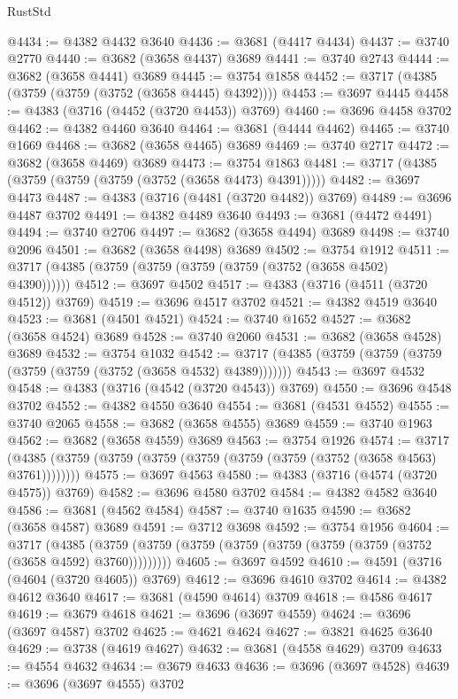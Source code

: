 \begin{lexlean}{RustStd}
\begin{coremodule}
@4434 := @4382 @4432 @3640
@4436 := @3681 (@4417 @4434)
@4437 := @3740 @2770
@4440 := @3682 (@3658 @4437) @3689
@4441 := @3740 @2743
@4444 := @3682 (@3658 @4441) @3689
@4445 := @3754 @1858
@4452 := @3717 (@4385 (@3759 (@3759 (@3752 (@3658 @4445) @4392))))
@4453 := @3697 @4445
@4458 := @4383 (@3716 (@4452 (@3720 @4453)) @3769)
@4460 := @3696 @4458 @3702
@4462 := @4382 @4460 @3640
@4464 := @3681 (@4444 @4462)
@4465 := @3740 @1669
@4468 := @3682 (@3658 @4465) @3689
@4469 := @3740 @2717
@4472 := @3682 (@3658 @4469) @3689
@4473 := @3754 @1863
@4481 := @3717 (@4385 (@3759 (@3759 (@3759 (@3752 (@3658 @4473) @4391)))))
@4482 := @3697 @4473
@4487 := @4383 (@3716 (@4481 (@3720 @4482)) @3769)
@4489 := @3696 @4487 @3702
@4491 := @4382 @4489 @3640
@4493 := @3681 (@4472 @4491)
@4494 := @3740 @2706
@4497 := @3682 (@3658 @4494) @3689
@4498 := @3740 @2096
@4501 := @3682 (@3658 @4498) @3689
@4502 := @3754 @1912
@4511 := @3717 (@4385 (@3759 (@3759 (@3759 (@3759 (@3752 (@3658 @4502) @4390))))))
@4512 := @3697 @4502
@4517 := @4383 (@3716 (@4511 (@3720 @4512)) @3769)
@4519 := @3696 @4517 @3702
@4521 := @4382 @4519 @3640
@4523 := @3681 (@4501 @4521)
@4524 := @3740 @1652
@4527 := @3682 (@3658 @4524) @3689
@4528 := @3740 @2060
@4531 := @3682 (@3658 @4528) @3689
@4532 := @3754 @1032
@4542 := @3717 (@4385 (@3759 (@3759 (@3759 (@3759 (@3759 (@3752 (@3658 @4532) @4389)))))))
@4543 := @3697 @4532
@4548 := @4383 (@3716 (@4542 (@3720 @4543)) @3769)
@4550 := @3696 @4548 @3702
@4552 := @4382 @4550 @3640
@4554 := @3681 (@4531 @4552)
@4555 := @3740 @2065
@4558 := @3682 (@3658 @4555) @3689
@4559 := @3740 @1963
@4562 := @3682 (@3658 @4559) @3689
@4563 := @3754 @1926
@4574 := @3717 (@4385 (@3759 (@3759 (@3759 (@3759 (@3759 (@3759 (@3752 (@3658 @4563) @3761))))))))
@4575 := @3697 @4563
@4580 := @4383 (@3716 (@4574 (@3720 @4575)) @3769)
@4582 := @3696 @4580 @3702
@4584 := @4382 @4582 @3640
@4586 := @3681 (@4562 @4584)
@4587 := @3740 @1635
@4590 := @3682 (@3658 @4587) @3689
@4591 := @3712 @3698
@4592 := @3754 @1956
@4604 := @3717
    (@4385 (@3759 (@3759 (@3759 (@3759 (@3759 (@3759 (@3759 (@3752 (@3658 @4592) @3760)))))))))
@4605 := @3697 @4592
@4610 := @4591 (@3716 (@4604 (@3720 @4605)) @3769)
@4612 := @3696 @4610 @3702
@4614 := @4382 @4612 @3640
@4617 := @3681 (@4590 @4614) @3709
@4618 := @4586 @4617
@4619 := @3679 @4618
@4621 := @3696 (@3697 @4559)
@4624 := @3696 (@3697 @4587) @3702
@4625 := @4621 @4624
@4627 := @3821 @4625 @3640
@4629 := @3738 (@4619 @4627)
@4632 := @3681 (@4558 @4629) @3709
@4633 := @4554 @4632
@4634 := @3679 @4633
@4636 := @3696 (@3697 @4528)
@4639 := @3696 (@3697 @4555) @3702

\end{coremodule}
\end{lexlean}
